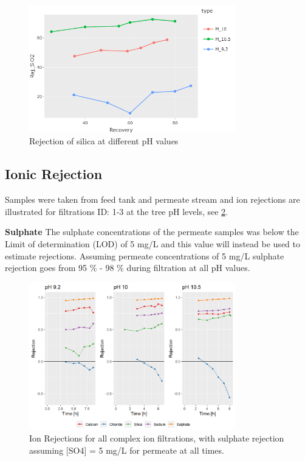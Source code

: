 \begin{figure}[H]
    \centering
    \includegraphics[width=0.8\textwidth]{Billeder/data/multi_salt/silica_rejection.png}
    \caption{Rejection of silica at different pH values}
    \label{fig:silica_rejection_multi_salt}
\end{figure}



\subsection{Ionic Rejection}

Samples were taken from feed tank and permeate stream and ion rejections are illustrated for filtrations ID: 1-3 at the tree pH levels, see \cref{fig:multi_salt_pH_ion_rejections_samlet_med_sulfat_og_silica}.

\textbf{Sulphate}
The sulphate concentrations of the permeate samples was below the Limit of determination (LOD) of 5 mg/L and this value will instead be used to estimate rejections.
Assuming permeate concentrations of 5 mg/L sulphate rejection goes from 95 \% - 98 \% during filtration at all pH values.


\begin{figure}[H]
    \centering
    \includegraphics[width=0.8\textwidth]{Billeder/data/multi_salt/multisalt_ion_rejections_with_sulphate_and_silica.png}
    \caption{Ion Rejections for all complex ion filtrations, with sulphate rejection assuming [SO4] = 5 mg/L for permeate at all times.}
    \label{fig:multi_salt_pH_ion_rejections_samlet_med_sulfat_og_silica}
\end{figure}



